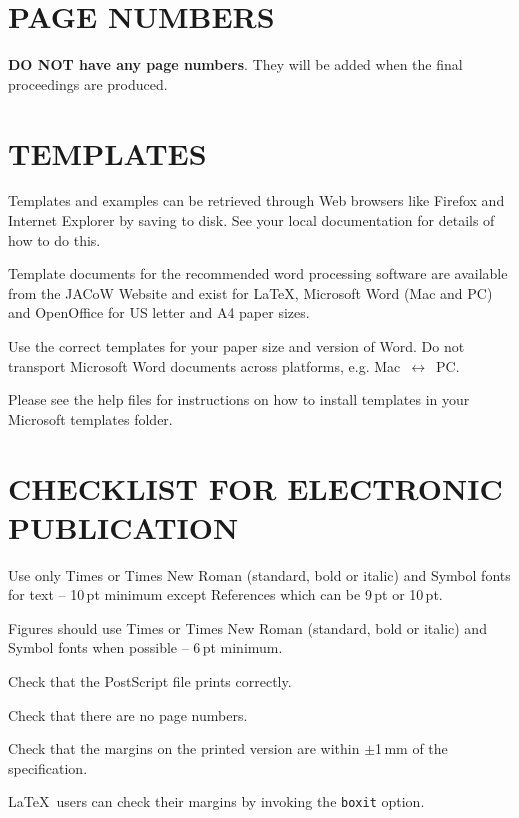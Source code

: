 \documentclass{JAC2003}
\begin{document}
\section{PAGE NUMBERS}

\textbf{DO NOT have any page numbers}. They will be added 
when the final proceedings are produced.

\section{TEMPLATES}

Templates and examples can be retrieved through Web browsers like Firefox
and Internet Explorer by saving to disk. See your local documentation for
details of how to do this.

Template documents for the recommended word processing software are
available from the JACoW Website and exist for
\LaTeX, Microsoft Word (Mac and PC) and OpenOffice for US letter and A4 paper sizes.

Use the correct templates for  your paper size and version of Word.
Do not transport Microsoft Word documents across platforms, e.g.
Mac~$\leftrightarrow$~PC.

Please see the help files for instructions  on  how to
install templates in your Microsoft templates folder.

\section{CHECKLIST FOR ELECTRONIC PUBLICATION}

\begin{Itemize}
    \item  Use only Times or Times New Roman (standard, bold or italic) and Symbol 
    			fonts for text -- 10\,pt minimum except References which can be 9\,pt or 10\,pt.
    \item  Figures should use Times or Times New Roman (standard, bold or italic) and Symbol fonts when possible
            -- 6\,pt minimum.
    \item  Check that the PostScript file prints correctly.
    \item  Check that there are no page numbers.
    \item  Check that the margins on the printed version are within $\pm$1\,mm of the specification.
    \item  \LaTeX\ users can check their margins by invoking the
           \texttt{boxit} option.
\end{Itemize}
\end{document}
